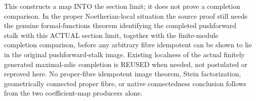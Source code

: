 \begin{remark}
This constructs a map INTO the section limit; it does not prove a
completion comparison. In the proper Noetherian-local situation the
source proof still needs the genuine formal-functions theorem identifying
the completed pushforward stalk with this ACTUAL section limit, together
with the finite-module completion comparison, before any arbitrary fibre
idempotent can be shown to lie in the original pushforward-stalk image.
Existing localness of the actual finitely generated maximal-adic
completion is REUSED when needed, not postulated or reproved here.
No proper-fibre idempotent image theorem, Stein factorization,
geometrically connected proper fibre, or native connectedness conclusion
follows from the two coefficient-map producers alone.
\end{remark}
